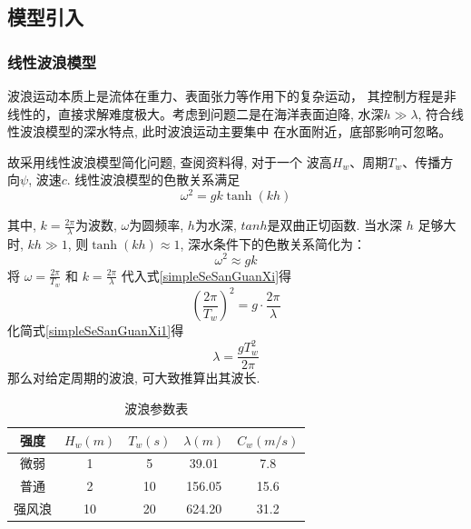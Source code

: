 \documentclass{cumcmthesis}
\begin{document}
\subsection{模型引入}

\subsubsection{线性波浪模型}

波浪运动本质上是流体在重力、表面张力等作用下的复杂运动，
其控制方程是非线性的，直接求解难度极大。考虑到问题二是在海洋表面迫降,
水深\(h \gg \lambda\), 符合线性波浪模型的深水特点, 此时波浪运动主要集中
在水面附近，底部影响可忽略。

故采用线性波浪模型简化问题, 查阅资料得, 对于一个
波高$H_w$、周期$T_w$、传播方向$\psi$, 波速$c$. 线性波浪模型的色散关系满足
\begin{equation}
    \omega^2 = gk \tanh(kh)
    \label{seSanGuanXi}
\end{equation}

其中, $k=\frac{2\pi}{\lambda}$为波数, $\omega$为圆频率, $h$为水深, $tanh$是双曲正切函数.
当水深 \( h \) 足够大时, \( kh \gg 1 \), 则$\tanh(kh) \approx 1$, 深水条件下的色散关系简化为：
\begin{equation}
    \omega^2 \approx gk
    \label{simpleSeSanGuanXi}
\end{equation}
将 \( \omega = \frac{2\pi}{T_w} \) 和 \( k = \frac{2\pi}{\lambda} \) 代入式\eqref{simpleSeSanGuanXi}得
\begin{equation}
    \left( \frac{2\pi}{T_w} \right)^2 = g \cdot \frac{2\pi}{\lambda}
    \label{simpleSeSanGuanXi1}
\end{equation}
    化简式\eqref{simpleSeSanGuanXi1}得
\begin{equation}
     \lambda = \frac{g T_w^2}{2\pi} 
    \label{FormulaOfLambda}
\end{equation}
    那么对给定周期的波浪, 可大致推算出其波长. 

\begin{table}[h]
    \centering
    \caption{波浪参数表} 
    \begin{tabular}{|c|c|c|c|c|}
        \hline
        强度 & $H_w (m)$ & $T_w (s)$ & $\lambda (m)$ & $C_w (m/s)$ \\
        \hline
        微弱 & 1 & 5 & 39.01 & 7.8  \\
        \hline
        普通 & 2 & 10 & 156.05 & 15.6 \\
        \hline
        强风浪 & 10 & 20 & 624.20 & 31.2  \\
        \hline
    \end{tabular}
    \label{tab:wave_params} 
\end{table}
\end{document}
